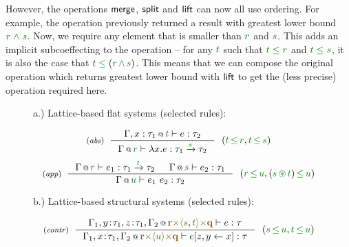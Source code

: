 However, the operations $\textnormal{\sffamily merge}$, $\textnormal{\sffamily split}$ and $\textnormal{\sffamily lift}$ can now all
use ordering. For example, the  operation previously returned
a result with greatest lower bound $\cclrd{r}\;\czip\;\cclrd{s}$. Now, we require any
element that is smaller than $\cclrd{r}$ and $\cclrd{s}$. This adds an implicit subcoeffecting
to the operation -- for any $\cclrd{t}$ such that $\cclrd{t}\;\cleq\;\cclrd{r}$ and
$\cclrd{t}\;\cleq\;\cclrd{s}$, it is also the case that $\cclrd{t}\;\cleq\;(\cclrd{r}\,\czip\,\cclrd{s})$.
This means that we can compose the original  operation which returns greatest lower
bound with $\textnormal{\sffamily lift}$ to get the (less precise) operation required here.


\begin{figure}[t]
{\small a.) Lattice-based flat systems (selected rules):}

\begin{equation*}
\tyrule{abs}
  {\coctx{\Gamma, x:\tau_1}{\cclrd{t}} \vdash e : \tau_2}
  {\coctx{\Gamma}{\cclrd{r}} \vdash \lambda x.e : \tau_1 \xrightarrow{\cclrd{s}} \tau_2 }
~~(\cclrd{t}\,\cleq\,\cclrd{r}, \cclrd{t}\,\cleq\,\cclrd{s})
\end{equation*}
\begin{equation*}
\tyrule{app}
  {\coctx{\Gamma}{\cclrd{r}} \vdash e_1 : \tau_1 \xrightarrow{\cclrd{t}} \tau_2 &
   \coctx{\Gamma}{\cclrd{s}} \vdash e_2 : \tau_1 }
  {\coctx{\Gamma}{\cclrd{u}} \vdash e_1~e_2 : \tau_2}
~~(\cclrd{r}\,\cleq\,\cclrd{u}, (\cclrd{s} \,\cseq\, \cclrd{t})\,\cleq\,\cclrd{u})
\end{equation*}

\vspace{1.5em}
{\small b.) Lattice-based structural systems (selected rules):}

\begin{equation*}
\tyrule{contr}
  {\coctx{\Gamma_1,y\!:\!\tau_1,z\!:\!\tau_1,\Gamma_2}{\aclrd{\textbf{r}} \atimes \alift{\cclrd{s},\cclrd{t}} \atimes \aclrd{\textbf{q}}} \vdash e : \tau}
  {\coctx{\Gamma_1,x\!:\!\tau_1,\Gamma_2}{\aclrd{\textbf{r}} \atimes \alift{\cclrd{u}} \atimes \aclrd{\textbf{q}}} \vdash \subst{e}{z,y}{x} : \tau}
~~(\cclrd{s}\,\cleq\,\cclrd{u}, \cclrd{t}\,\cleq\,\cclrd{u})
\end{equation*}

\label{fig:further-lattice-types}
\end{figure}

